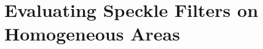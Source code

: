 \documentclass[journal]{IEEEtran}
\begin{document}
%
%
%
%
%
%
%

\section{Evaluating Speckle Filters on Homogeneous Areas}
\end{document}
